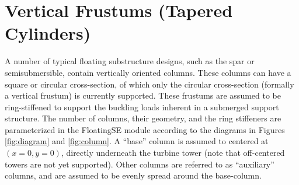 \section{Vertical Frustums (Tapered Cylinders)}
A number of typical floating substructure designs, such as the spar or
semisubmersible, contain vertically oriented columns.  These columns can
have a square or circular cross-section, of which only the circular
cross-section (formally a vertical frustum) is currently supported.
These frustums are assumed to be ring-stiffened to support the buckling
loads inherent in a submerged support structure.  The number of columns,
their geometry, and the ring stiffeners are parameterized in the
FloatingSE module according to the diagrams in Figures \ref{fig:diagram}
and \ref{fig:column}.  A ``base'' column is
assumed to centered at $(x=0, y=0)$, directly underneath the turbine
tower (note that off-centered towers are not yet supported).  Other
columns are referred to as ``auxiliary'' columns, and are assumed to be
evenly spread around the base-column.
%

